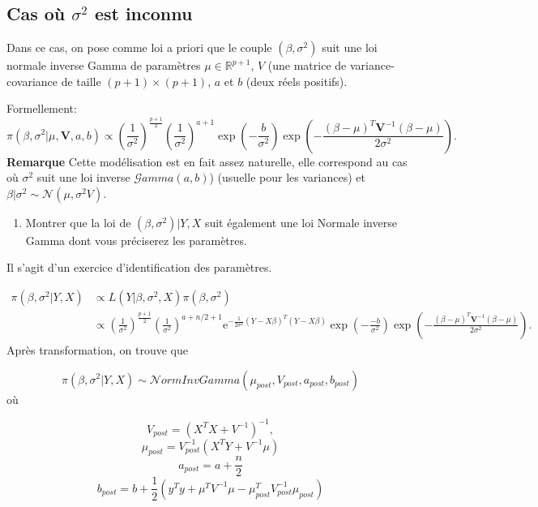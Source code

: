 \documentclass[]{article}
\providecommand{\tightlist}{%
  \setlength{\itemsep}{0pt}\setlength{\parskip}{0pt}}
\newenvironment{Correction}%
  { \vspace{\baselineskip}\begin{mdframed}[backgroundcolor=my_green]}%
  {\end{mdframed}}
\begin{document}
\hypertarget{cas-ouxf9-sigma2-est-inconnu}{%
\subsection{\texorpdfstring{Cas où \(\sigma^2\) est
inconnu}{Cas où \textbackslash{}sigma\^{}2 est inconnu}}\label{cas-ouxf9-sigma2-est-inconnu}}

Dans ce cas, on pose comme loi a priori que le couple
\((\beta, \sigma^2)\) suit une loi normale inverse Gamma de paramètres
\(\mu \in \mathbb{R}^{p +1}\), \(V\) (une matrice de variance-covariance
de taille \((p+1) \times (p+1)\), \(a\) et \(b\) (deux réels positifs).

Formellement:
\[\pi(\beta ,\sigma^{2}\vert \mu , \mathbf{V},a ,b )\propto
\left({\frac {1}{\sigma ^{2}}}\right)^{\frac{p +1}{2}}\left({\frac {1}{\sigma ^{2}}}\right)^{a + 1}\exp \left(-\frac{b}{\sigma^2}\right)\exp \left(-{\frac {(\beta -\mu)^T\mathbf {V} ^{-1}(\beta - \mu)}{2\sigma ^{2}}}\right).\]
\textbf{Remarque} Cette modélisation est en fait assez naturelle, elle
correspond au cas où \(\sigma^2\) suit une loi inverse
\(\mathcal{G}amma(a, b)\)) (usuelle pour les variances) et
\(\beta \vert \sigma^2\sim \mathcal{N}(\mu, \sigma^2V)\).

\begin{enumerate}
\def\labelenumi{\arabic{enumi}.}
\tightlist
\item
  Montrer que la loi de \((\beta,\sigma^2)\vert Y, X\) suit également
  une loi Normale inverse Gamma dont vous préciserez les paramètres.
\end{enumerate}

\begin{Correction}

Il s'agit d'un exercice d'identification des paramètres.

\begin{align*}
\pi(\beta, \sigma^2 \vert Y, X) &\propto L(Y\vert \beta, \sigma^2, X) \pi(\beta, \sigma^2)\\
&\propto \left({\frac {1}{\sigma ^{2}}}\right)^{\frac{p +1}{2}}\left(\frac{1}{\sigma^2}\right)^{a + n/2 + 1}\text{e}^{-\frac{1}{2\sigma^2}(Y - X\beta)^T(Y-X\beta)}\exp \left(-\frac{-b}{\sigma^2}\right)\exp \left(-{\frac {(\beta -\mu)^T\mathbf {V} ^{-1}(\beta - \mu)}{2\sigma ^{2}}}\right).
\end{align*}
Après transformation, on trouve que

$$\pi(\beta, \sigma^2 \vert Y, X) \sim \mathcal{N}orm{I}nv{G}amma(\mu_{post}, V_{post}, a_{post}, b_{post})$$
où

$$V_{post} = (X^TX + V^{-1})^{-1},$$
$$\mu_{post} = V_{post}^{-1}(X^TY + V^{-1}\mu)$$
$$a_{post} = a + \frac{n}{2}$$
$$b_{post} = b + \frac{1}{2}(y^Ty + \mu^TV^{-1}\mu - \mu_{post}^TV_{post}^{-1}\mu_{post})$$
\end{Correction}
\end{document}
